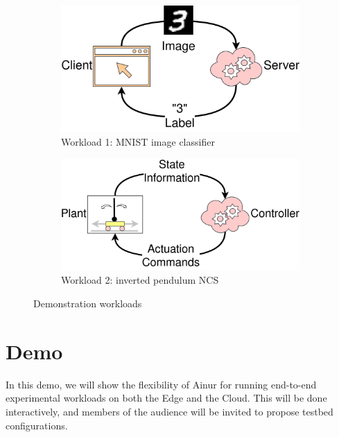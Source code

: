 \begin{figure}
    \centering
    \begin{subfigure}{.45\textwidth}
        \centering
        \includegraphics[width=.9\textwidth]{publications/2022Ainur/figures/demo_workload_1}
        \caption{Workload 1: \acs{MNIST} image classifier}\label{paper:olguinmunoz2022ainur:fig:wkld:mnist}
    \end{subfigure}%
    \hfill%
    \begin{subfigure}{.45\textwidth}
        \centering
        \includegraphics[width=.9\textwidth]{publications/2022Ainur/figures/demo_workload_2}
        \caption{Workload 2: inverted pendulum \acs{NCS}}\label{paper:olguinmunoz2022ainur:fig:wkld:ncs}
    \end{subfigure}
    \caption{Demonstration workloads}\label{paper:olguinmunoz2022ainur:fig:wkld}
\end{figure}

\section{Demo}\label{paper:olguinmunoz2022ainur:demo}

In this demo, we will show the flexibility of Ainur for running end-to-end experimental workloads on both the Edge and the Cloud.
This will be done interactively, and members of the audience will be invited to propose testbed configurations.

